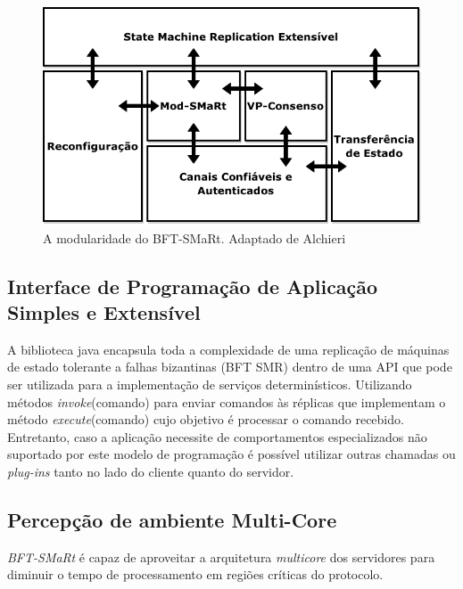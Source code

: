 		\begin{figure}[htb]
			\begin{center}
				
				\includegraphics[clip,width=13.0cm]{images/image4.png}
				\caption{A modularidade do BFT-SMaRt. Adaptado de Alchieri~\cite{bessani3}}
				\label{fig:vis_sis}
			\end{center}
		\end{figure}
		
		\subsection{Interface de Programação de Aplicação Simples e Extensível}
		A biblioteca java encapsula toda a complexidade de uma replicação de máquinas de estado tolerante a falhas bizantinas (BFT SMR) dentro de uma API que pode ser utilizada para a implementação de serviços determinísticos. Utilizando métodos \textit{invoke}(comando) para enviar comandos às réplicas que implementam o método \textit{execute}(comando) cujo objetivo é processar o comando recebido. Entretanto, caso a aplicação necessite de comportamentos especializados não suportado por este modelo de programação é possível utilizar outras chamadas ou \textit{plug-ins} tanto no lado do cliente quanto do servidor.\\
		
		
		\subsection{Percepção de ambiente Multi-Core}
		\textit{BFT-SMaRt} é capaz de aproveitar a arquitetura \textit{multicore} dos servidores para diminuir o tempo de processamento em regiões críticas do protocolo.\\
		
